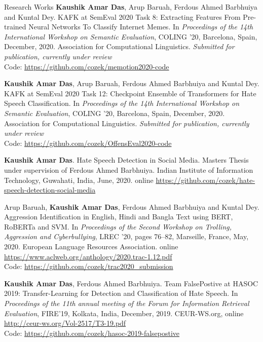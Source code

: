 \documentclass{resume} %
\begin{document}
\begin{rSection}{Research Works}
    \label{pub:hasoc}
         {\bf Kaushik Amar Das}, Arup Baruah, Ferdous Ahmed Barbhuiya and Kuntal Dey.
         KAFK at SemEval 2020 Task 8: Extracting Features From Pre-trained Neural Networks To 
         Classify Internet Memes. In \textit{Proceedings of the 14th International Workshop 
         on Semantic Evaluation}, COLING ’20, Barcelona, Spain, December, 2020. 
         Association for Computational Linguistics. 
         \emph{Submitted for publication, currently under review}
         \\Code: \url{https://github.com/cozek/memotion2020-code}
         \somepadding
    
        {\bf Kaushik Amar Das}, Arup Baruah, Ferdous Ahmed Barbhuiya and 
        Kuntal Dey. KAFK at SemEval 2020 Task 12: Checkpoint Ensemble of 
        Transformers for Hate Speech Classification.  In \textit{Proceedings 
        of the 14th International Workshop on Semantic Evaluation},  
        COLING ’20, Barcelona, Spain, December, 2020. Association for 
        Computational Linguistics.
        \emph{Submitted for publication, currently under review}
        \\ Code: \url{https://github.com/cozek/OffensEval2020-code}
        \somepadding


        {\bf Kaushik Amar Das}. Hate Speech Detection in Social Media. 
        Masters Thesis under supervision of Ferdous Ahmed Barbhuiya. 
        Indian Institute of Information Technology, Guwahati, India, June, 2020.
        online \url{https://github.com/cozek/hate-speech-detection-social-media}
        \somepadding


        Arup Baruah, {\bf Kaushik Amar Das}, Ferdous Ahmed Barbhuiya and 
        Kuntal Dey. Aggression Identification in English, Hindi and Bangla 
        Text using BERT, RoBERTa and SVM.  In \textit{Proceedings of the 
        Second Workshop on Trolling, Aggression and Cyberbullying},  
        LREC ’20, pages 76--82,  Marseille, France, May, 2020. European 
        Language Resources Association.  
        online \url{https://www.aclweb.org/anthology/2020.trac-1.12.pdf}
        \\Code: \url{https://github.com/cozek/trac2020_submission}
        \somepadding

        {\bf Kaushik Amar Das}, Ferdous Ahmed Barbhuiya. 
        Team FalsePostive at HASOC 2019: Transfer-Learning for 
        Detection and Classification of Hate Speech. 
        In \textit{Proceedings of the 11th annual meeting of the Forum 
        for Information Retrieval Evaluation}, FIRE'19, Kolkata, India, 
        December, 2019. CEUR-WS.org, 
        online \url{http://ceur-ws.org/Vol-2517/T3-19.pdf}
        \\Code: \url{https://github.com/cozek/hasoc-2019-falsepostive}
        \somepadding
    
    \end{rSection}
\end{document}
